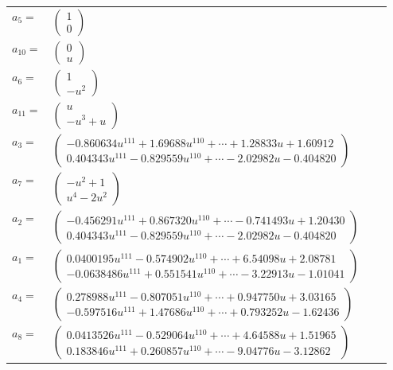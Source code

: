 \documentclass[1p]{elsarticle_modified}
\theoremstyle{definition}
\begin{document}
\begin{tabular}{m{7pt} m{180pt} m{7pt} m{180pt} }
\flushright $a_{5}=$&$\begin{pmatrix}1\\0\end{pmatrix}$ \\
\flushright $a_{10}=$&$\begin{pmatrix}0\\u\end{pmatrix}$ \\
\flushright $a_{6}=$&$\begin{pmatrix}1\\- u^2\end{pmatrix}$ \\
\flushright $a_{11}=$&$\begin{pmatrix}u\\- u^3+u\end{pmatrix}$ \\
\flushright $a_{3}=$&$\begin{pmatrix}-0.860634 u^{111}+1.69688 u^{110}+\cdots+1.28833 u+1.60912\\0.404343 u^{111}-0.829559 u^{110}+\cdots-2.02982 u-0.404820\end{pmatrix}$ \\
\flushright $a_{7}=$&$\begin{pmatrix}- u^2+1\\u^4-2 u^2\end{pmatrix}$ \\
\flushright $a_{2}=$&$\begin{pmatrix}-0.456291 u^{111}+0.867320 u^{110}+\cdots-0.741493 u+1.20430\\0.404343 u^{111}-0.829559 u^{110}+\cdots-2.02982 u-0.404820\end{pmatrix}$ \\
\flushright $a_{1}=$&$\begin{pmatrix}0.0400195 u^{111}-0.574902 u^{110}+\cdots+6.54098 u+2.08781\\-0.0638486 u^{111}+0.551541 u^{110}+\cdots-3.22913 u-1.01041\end{pmatrix}$ \\
\flushright $a_{4}=$&$\begin{pmatrix}0.278988 u^{111}-0.807051 u^{110}+\cdots+0.947750 u+3.03165\\-0.597516 u^{111}+1.47686 u^{110}+\cdots+0.793252 u-1.62436\end{pmatrix}$ \\
\flushright $a_{8}=$&$\begin{pmatrix}0.0413526 u^{111}-0.529064 u^{110}+\cdots+4.64588 u+1.51965\\0.183846 u^{111}+0.260857 u^{110}+\cdots-9.04776 u-3.12862\end{pmatrix}$ \\

\end{tabular}
\end{document}
